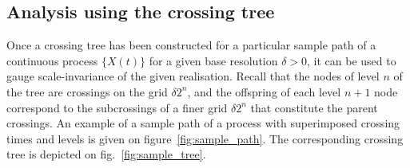 
\subsection{Analysis using the crossing tree} %
\label{sub:analysis_using_the_crossing_tree}

Once a crossing tree has been constructed for a particular sample path of a continuous
process $\{X(t)\}$ for a given base resolution $\delta>0$, it can be used to gauge
scale-invariance of the given realisation. Recall that the nodes of level $n$ of
the tree are crossings on the grid $\delta 2^n$, and the offspring of each level
$n+1$ node correspond to the subcrossings of a finer grid $\delta 2^n$ that constitute
the parent crossings. An example of a sample path of a process with superimposed
crossing times and levels is given on figure~\ref{fig:sample_path}. The corresponding
crossing tree is depicted on fig.~\ref{fig:sample_tree}.

